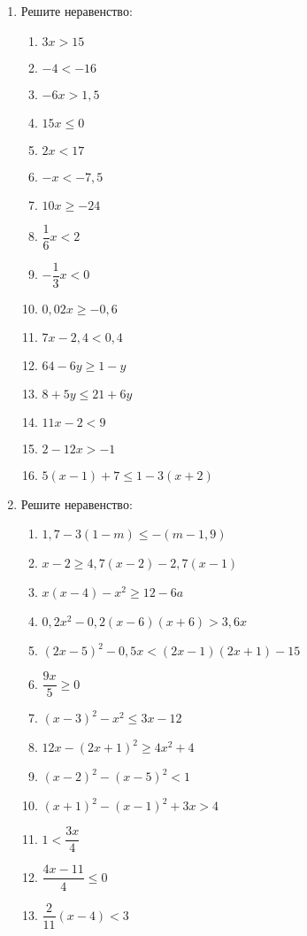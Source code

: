\documentclass[12pt, a4paper]{article}
\begin{document}
		

\begin{enumerate}
	\item Решите неравенство:
	\begin{multicols}{2}
		\begin{enumerate}[label=\asbuk*)]
			\item $3x>15$
			\item $-4<-16$
			\item $-6x>1,5$
			\item $15x\le0$
			\item $2x<17$
			\item $-x<-7,5$
			\item $10x\ge-24$
			\item $\dfrac{1}{6}x<2$
			\item $-\dfrac{1}{3}x<0$
			\item $0,02x\ge-0,6$
			\item $7x-2,4<0,4$
			\item $64-6y\ge1-y$
			\item $8+5y\le21+6y$
			\item $11x-2<9$
			\item $2-12x>-1$
			\item $5(x-1)+7\le1-3(x+2)$
		\end{enumerate}
	\end{multicols}
	\item Решите неравенство:
	\begin{multicols}{2}
		\begin{enumerate}[label=\asbuk*)]
			\item $1,7-3(1-m)\le-(m-1,9)$
			\item $x-2\ge4,7(x-2)-2,7(x-1)$
			\item $x(x-4)-x^2\ge12-6a$
			\item $0,2x^2-0,2(x-6)(x+6)>3,6x$
			\item $(2x-5)^2-0,5x<(2x-1)(2x+1)-15$
			\item $\dfrac{9x}{5}\ge0$
			\item $(x-3)^2-x^2\le3x-12$
			\item $12x-(2x+1)^2\ge4x^2+4$
			\item $(x-2)^2-(x-5)^2<1$
			\item $(x+1)^2-(x-1)^2+3x>4$
			\item $1<\dfrac{3x}{4}$
			\item $\dfrac{4x-11}{4}\le0$
			\item $\dfrac{2}{11}(x-4)<3$

\end{enumerate}
\end{multicols}
\end{enumerate}
\end{document}
